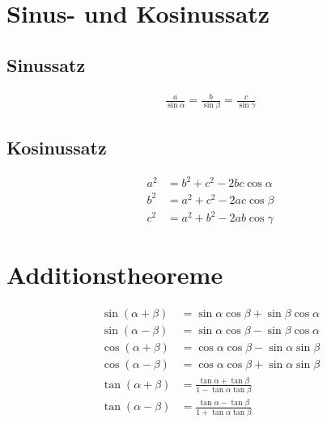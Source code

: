 \documentclass[11pt, a4paper]{scrartcl}
\begin{document}
	\section{Sinus- und Kosinussatz}
	\subsection{Sinussatz}
	\begin{align*}
		\frac{a}{\sin \alpha} = \frac{b}{\sin \beta} = \frac{c}{\sin \gamma}
	\end{align*}
	\subsection{Kosinussatz}
	\begin{align*}
		a^2 & = b^2 + c^2 - 2bc \cos \alpha \\
		b^2 & = a^2 + c^2 - 2ac \cos \beta \\
		c^2 & = a^2 + b^2 - 2ab \cos \gamma
	\end{align*}
	\section{Additionstheoreme}
	\begin{align*}
		\sin(\alpha+\beta) & = \sin \alpha \cos \beta + \sin \beta \cos \alpha \\
		\sin(\alpha-\beta) & = \sin \alpha \cos \beta - \sin \beta \cos \alpha \\
		\cos(\alpha+\beta) & = \cos \alpha \cos \beta - \sin \alpha \sin \beta \\
		\cos(\alpha-\beta) & = \cos \alpha \cos \beta + \sin \alpha \sin \beta \\
		\tan(\alpha+\beta) &= \frac{\tan \alpha + \tan \beta}{1-\tan \alpha \tan \beta} \\
		\tan(\alpha-\beta) &= \frac{\tan \alpha - \tan \beta}{1+\tan \alpha \tan \beta}
	\end{align*}
\end{document}
